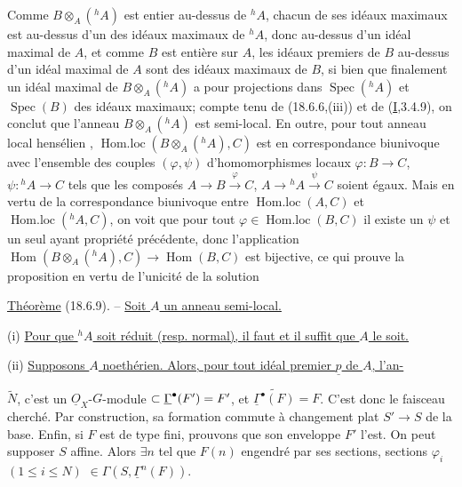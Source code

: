  Comme $B\otimes_A({}^h A)$ est entier au-dessus de ${}^h A$, chacun de ses idéaux maximaux est au-dessus d'un des idéaux maximaux de ${}^h A$, donc au-dessus d'un idéal maximal de $A$, et comme $B$ est entière sur $A$, les idéaux premiers de $B$ au-dessus d'un idéal maximal de $A$ sont des idéaux maximaux de $B$, si bien que finalement un idéal maximal de $B\otimes_A({}^h A)$ a pour projections dans $\operatorname{Spec}({}^h A)$ et $\operatorname{Spec}(B)$ des idéaux maximaux; compte tenu de (18.6.6,(iii)) et de (\uline{I},3.4.9), on conclut que l'anneau $B\otimes_A({}^h A)$ est semi-local. En outre, pour tout anneau local hensélien , $\operatorname{Hom.loc}(B\otimes_A({}^h A),C)$ est en correspondance biunivoque avec l'ensemble des couples $(\varphi,\psi)$ d'homomorphismes locaux $\varphi:B\to C$, $\psi:{}^h A\to C$ tels que les composés $A\to B\xrightarrow{\varphi}C$, $A\to{}^h A\xrightarrow{\psi}C$ soient égaux. Mais  en vertu de la correspondance biunivoque entre $\operatorname{Hom.loc}(A,C)$ et $\operatorname{Hom.loc}({}^h A,C)$, on voit que pour tout $\varphi\in\operatorname{Hom.loc}(B,C)$ il existe un $\psi$ et un seul ayant  propriété précédente, donc l'application $\operatorname{Hom}(B\otimes_A({}^h A),C)\to\operatorname{Hom}(B,C)$ est bijective, ce qui prouve la proposition en vertu de l'unicité de la solution


\uline{Théorème} (18.6.9). -- \uline{Soit $A$ un anneau semi-local.}

(i) \uline{Pour que ${}^h A$ soit réduit (resp. normal), il faut et il suffit que $A$ le soit.}

(ii) \uline{Supposons $A$ noethérien. Alors, pour tout idéal premier $\underline p$ de $A$, l'an-}

$\widetilde N$, c'est un $\underline{O}_X$-$G$-module  $\subset\underline{\Gamma}^{\bullet}(F')=F'$, et  $\widetilde{\underline{\Gamma}^{\bullet}(F)}=F$. C'est donc le  faisceau cherché. Par construction, sa formation commute à  changement plat $S'\to S$ de la base. Enfin, si $F$ est de type fini,  prouvons que son enveloppe $F'$ l'est. On peut supposer $S$ affine. Alors $\exists n$ tel que $F(n)$  engendré par ses sections,  sections $\varphi_i$ \deleted{$\unsure{\in}$} $(1\leq i\leq N)$ $\in\Gamma(S,\underline{\Gamma}^n(F))$.


